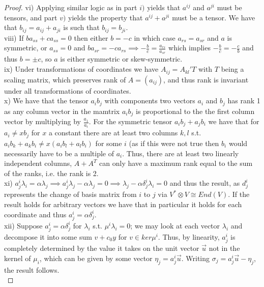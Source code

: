 \documentclass{article}
\begin{document}
\begin{proof}
  vi) Applying similar logic as in part $i)$ yields that $a^{ij}$ and $a^{ji}$ must be tensors, and part $v)$ yields the property that $a^{ij} + a^{ji}$ must be a tensor. We have that $b_{ij} = a_{ij}+a_{ji}$ is such that $b_{ij} = b_{ji}$. \\
  viii) If $ba_{ss} + ca_{ss} = 0$ then either $b = -c$ in which case $a_{rs} = a_{sr}$ and $a$ is symmetric, or $a_{ss} = 0$ and $ba_{sr} = -ca_{rs} \implies - \frac{b}{c} = \frac{a_{rs}}{a_{sr}}$ which implies $- \frac{b}{c} = - \frac{c}{b}$ and thus $b = \pm c$, so $a$ is either symmetric or skew-symmetric. \\
  ix) Under transformations of coordinates we have $A_{ij} = A_{kl}'T$ with $T$ being a scaling matrix, which preserves rank of $A = (a_{ij})$, and thus rank is invariant under all transformations of coordinates. \\
  x) We have that the tensor $a_{i}b_{j}$ with components two vectors $a_{i}$ and $b_{j}$ has rank 1 as any column vector in the mamtrix $a_{i}b_{j}$ is proportional to the the first column vector by multiplying by $\frac{a_{1}}{a_{i}}$. For the symmetric tensor $a_{i}b_{j} + a_{j}b_{i}$ we have that for $a_{i} \neq xb_{j}$ for $x$ a constant there are at least two columns $k,l$ s.t. $a_{i}b_{k} + a_{k}b_{i} \neq x(a_{i}b_{l} + a_{l}b_{i})$ for some $i$ (as if this were not true then $b_{i}$ would necessarily have to be a multiple of $a_{i}$. Thus, there are at least two linearly independent columns, $A + A^{T}$ can only have a maximum rank equal to the sum of the ranks, i.e. the rank is 2. \\
  xi) $a_{j}^{i}\lambda_{i} =  \alpha \lambda_{j} \implies a_{j}^{i}\lambda_{j}-\alpha\lambda_{j} = 0 \implies \lambda_{j} - \alpha \delta^{i}_{j}\lambda_{i} = 0$ and thus the result, as $d^{i}_{j}$ represents the change of basis matrix from $i$ to $j$ via $V^{*}\otimes V \cong End(V)$. If the result holds for arbitrary vectors we have that in particular it holds for each coordinate and thus $a_{j}^{i} = \alpha\delta_{j}^{i}$. \\
  xii) Suppose $a^{i}_{j} = \alpha \delta^{i}_{j}$ for $\lambda_{i}$ s.t. $\mu^{i}\lambda_{i} = 0$; we may look at each vector $\lambda_{i}$ and decompose it into some sum $v + c_{0}y$ for $v \in ker\mu^{i}$. Thus, by linearity, $a^{i}_{j}$ is completely determined by the value it takes on the unit vector $\vec{u}$ not in the kernel of $\mu_{i}$, which can be given by some vector $\eta_{j} = a_{j}^{i}\vec{u}$. Writing $\sigma_{j} = a_{j}^{i}\vec{u} - \eta_{j}$, the result follows. \\

\end{proof}
\end{document}

